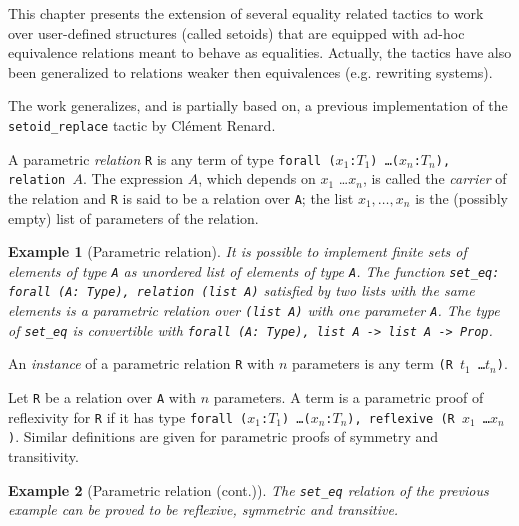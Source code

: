 \newtheorem{cscexample}{Example}

\label{setoid_replace}

This chapter presents the extension of several equality related tactics to
work over user-defined structures (called setoids) that are equipped with
ad-hoc equivalence relations meant to behave as equalities.
Actually, the tactics have also been generalized to relations weaker then
equivalences (e.g. rewriting systems).

The work generalizes, and is partially based on, a previous implementation of
the \texttt{setoid\_replace} tactic by Cl\'ement Renard.


A parametric \emph{relation} \texttt{R} is any term of type
\texttt{forall ($x_1$:$T_1$) \ldots ($x_n$:$T_n$), relation $A$}. The
expression $A$, which depends on $x_1$ \ldots $x_n$, is called the
\emph{carrier} of the relation and \texttt{R} is
said to be a relation over \texttt{A}; the list $x_1,\ldots,x_n$
is the (possibly empty) list of parameters of the relation.

\firstexample
\begin{cscexample}[Parametric relation]
It is possible to implement finite sets of elements of type \texttt{A}
as unordered list of elements of type \texttt{A}. The function
\texttt{set\_eq: forall (A: Type), relation (list A)} satisfied by two lists
with the same elements is a parametric relation over \texttt{(list A)} with
one parameter \texttt{A}. The type of \texttt{set\_eq} is convertible with
\texttt{forall (A: Type), list A -> list A -> Prop}.
\end{cscexample}

An \emph{instance} of a parametric relation \texttt{R} with $n$ parameters
is any term \texttt{(R $t_1$ \ldots $t_n$)}.

Let \texttt{R} be a relation over \texttt{A} with $n$ parameters.
A term is a parametric proof of reflexivity for \texttt{R} if it has type
\texttt{forall ($x_1$:$T_1$) \ldots ($x_n$:$T_n$),
 reflexive (R $x_1$ \ldots $x_n$)}. Similar definitions are given for
parametric proofs of symmetry and transitivity.

\begin{cscexample}[Parametric relation (cont.)]
The \texttt{set\_eq} relation of the previous example can be proved to be
reflexive, symmetric and transitive.
\end{cscexample}

